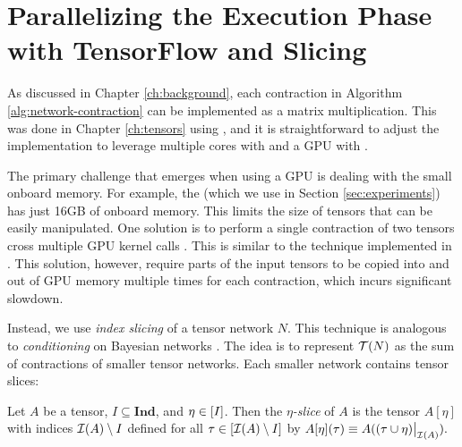 \section{Parallelizing the Execution Phase with TensorFlow and Slicing}
\label{sec:parallel:execution}
As discussed in Chapter \ref{ch:background}, each contraction in Algorithm \ref{alg:network-contraction} can be implemented as a matrix multiplication.
This was done in Chapter \ref{ch:tensors} using  \cite{numpy}, and it is straightforward to adjust the implementation to leverage multiple cores with  and a GPU with  \cite{ABCCDDDGII16}.

The primary challenge that emerges when using a GPU is dealing with the small onboard memory. For example, the  (which we use in Section \ref{sec:experiments}) has just 16GB of onboard memory. This limits the size of tensors that can be easily manipulated. One solution is to perform a single contraction of two tensors cross multiple GPU kernel calls \cite{RRBSKH08}. This is similar to the technique implemented in  \cite{FHZ19}. This solution, however, require parts of the input tensors to be copied into and out of GPU memory multiple times for each contraction, which incurs significant slowdown.

Instead, we use \emph{index slicing} \cite{CZHNS18,GK20,VBNHRBM19} of a tensor network $N$. This technique is analogous to \emph{conditioning} on Bayesian networks \cite{darwiche01,dechter99,pearl86,SAS94}. The idea is to represent $\mathcal{T}(N)$ as the sum of contractions of smaller tensor networks. Each smaller network contains tensor slices:

\begin{definition}
Let $A$ be a tensor, $I \subseteq \textbf{Ind}$, and $\eta \in [I]$. Then the \emph{$\eta$-slice} of $A$ is the tensor $A[\eta]$ with indices $\mathcal{I}(A) \setminus I$ defined for all $\tau \in [\mathcal{I}(A) \setminus I]$ by $A[\eta](\tau) \equiv A((\tau \cup \eta)\big|_{\mathcal{I}(A)}).$
\end{definition}

